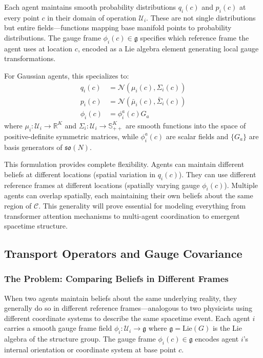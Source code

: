 \documentclass[11pt]{article}
\begin{document}
Each agent maintains smooth probability distributions $q_i(c)$ and $p_i(c)$ at every point $c$ in their domain of operation $\mathcal{U}_i$. These are not single distributions but entire fields---functions mapping base manifold points to probability distributions. The gauge frame $\phi_i(c) \in \mathfrak{g}$ specifies which reference frame the agent uses at location $c$, encoded as a Lie algebra element generating local gauge transformations.

For Gaussian agents, this specializes to:
\begin{align}
q_i(c) &= \mathcal{N}(\mu_i(c), \Sigma_i(c)) \\
p_i(c) &= \mathcal{N}(\bar{\mu}_i(c), \bar{\Sigma}_i(c)) \\
\phi_i(c) &= \phi_i^a(c) G_a
\end{align}
where $\mu_i: \mathcal{U}_i \to \mathbb{R}^K$ and $\Sigma_i: \mathcal{U}_i \to \mathbb{S}^K_{++}$ are smooth functions into the space of positive-definite symmetric matrices, while $\phi_i^a(c)$ are scalar fields and $\{G_a\}$ are basis generators of $\mathfrak{so}(N)$.

This formulation provides complete flexibility. Agents can maintain different beliefs at different locations (spatial variation in $q_i(c)$). They can use different reference frames at different locations (spatially varying gauge $\phi_i(c)$). Multiple agents can overlap spatially, each maintaining their own beliefs about the same region of $\mathcal{C}$. This generality will prove essential for modeling everything from transformer attention mechanisms to multi-agent coordination to emergent spacetime structure.

\subsection{Transport Operators and Gauge Covariance}

\subsubsection{The Problem: Comparing Beliefs in Different Frames}

When two agents maintain beliefs about the same underlying reality, they generally do so in different reference frames---analogous to two physicists using different coordinate systems to describe the same spacetime event. Each agent $i$ carries a smooth gauge frame field $\phi_i: \mathcal{U}_i \to \mathfrak{g}$ where $\mathfrak{g} = \mathrm{Lie}(G)$ is the Lie algebra of the structure group. The gauge frame $\phi_i(c) \in \mathfrak{g}$ encodes agent $i$'s internal orientation or coordinate system at base point $c$.
\end{document}
